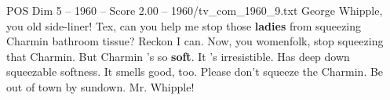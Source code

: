 \begin{textsample}{POS Dim 5 – 1960 – Score 2.00 – 1960/tv\_com\_1960\_9.txt}  \label{ex:f5_pos_087}
George Whipple, you old side-liner!
Tex, can you help me stop those \textbf{ladies} from squeezing Charmin bathroom tissue?
Reckon I can.
Now, you womenfolk, stop squeezing that Charmin.
But Charmin 's so \textbf{soft}.
It 's irresistible.
Has deep down squeezable softness.
It smells good, too.
Please don't squeeze the Charmin.
Be out of town by sundown.
Mr.
Whipple!

\end{textsample}
